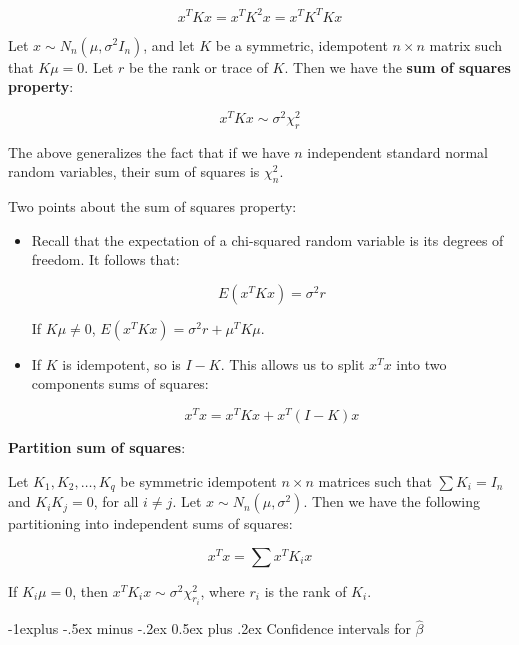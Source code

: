\documentclass[10pt,landscape]{article}
\makeatletter
\renewcommand{\subsection}{\@startsection{subsection}{2}{0mm}%
                                {-1explus -.5ex minus -.2ex}%
                                {0.5ex plus .2ex}%
                                {\normalfont\normalsize\bfseries}}
\makeatother
\begin{document}
\begin{multicols}{3}
\begin{equation}
x^T K x = x^T K^2 x = x^T K^T K x
\end{equation}

Let $x\sim N_n(\mu,\sigma^2 I_n)$, and let $K$ be a symmetric, idempotent $n \times n$ matrix such that $K\mu=0$. Let $r$ be the rank or trace of $K$. Then we have the \textbf{sum of squares property}:

\begin{equation}
x^T K x \sim \sigma^2 \chi_r^2
\end{equation}

The above generalizes the fact that if we have $n$ independent standard normal random variables, their sum of squares is $\chi_n^2$.

Two points about the sum of squares property:
\begin{itemize}
\item
Recall that the expectation of a chi-squared random variable is its degrees of freedom. It follows that:

\begin{equation}
E(x^T K x) =  \sigma^2 r 
\end{equation}

If $K\mu\neq 0$, $E(x^T K x) =  \sigma^2 r+\mu^T K\mu$. 

\item If $K$ is idempotent, so is $I-K$. This allows us to split $x^T x$ into two components sums of squares:

\begin{equation}
x^T x = x^T K x+x^T (I-K) x
\end{equation}
\end{itemize}

\textbf{Partition sum of squares}: 

 Let $K_1, K_2,\dots, K_q$ be symmetric idempotent $n \times n$ matrices such that
 $\sum K_i= I_n$ and $K_iK_j =0$, for all $i\neq j $. Let $x\sim N_n(\mu, \sigma^2)$.
 Then we have the following partitioning into independent sums of squares:
 
  \begin{equation}
x^T x = \sum x^T K_i x
\end{equation}

If $K_i \mu = 0$, then $ x^T K_i x\sim \sigma^2 \chi_{r_i}^2$, where $r_i$ is the rank of $K_i$.

\subsection{Confidence intervals for $\hat{\beta}$}


\end{multicols}
\end{document}
